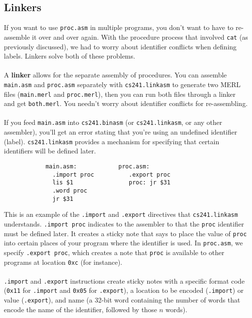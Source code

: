 \documentclass[]{article}
\theoremstyle{definition}
\begin{document}
		\subsection{Linkers}
			If you want to use \verb+proc.asm+ in multiple programs, you don't want to have to re-assemble it over and over again. With the procedure process that involved \verb+cat+ (as previously discussed), we had to worry about identifier conflicts when defining labels. Linkers solve both of these problems.
			\\ \\
			A \textbf{linker} allows for the separate assembly of procedures. You can assemble \verb+main.asm+ and \verb+proc.asm+ separately with \verb+cs241.linkasm+ to generate two MERL files (\verb+main.merl+ and \verb+proc.merl+), then you can run both files through a linker and get \verb+both.merl+. You needn't worry about identifier conflicts for re-assembling.
			\\ \\
			If you feed \verb+main.asm+ into \verb+cs241.binasm+ (or \verb+cs241.linkasm+, or any other assembler), you'll get an error stating that you're using an undefined identifier (label). \verb+cs241.linkasm+ provides a mechanism for specifying that certain identifiers will be defined later. 
			\begin{verbatim}
			main.asm:            proc.asm:
			  .import proc          .export proc
			  lis $1                proc: jr $31
			  .word proc
			  jr $31
			\end{verbatim}
			This is an example of the \verb+.import+ and \verb+.export+ directives that \verb+cs241.linkasm+ understands. \verb+.import proc+ indicates to the assembler to that the \verb+proc+ identifier must be defined later. It creates a sticky note that says to place the value of \verb+proc+ into certain places of your program where the identifier is used. In \verb+proc.asm+, we specify \verb+.export proc+, which creates a note that \verb+proc+ is available to other programs at location \verb+0xc+ (for instance).
			\\ \\
			\verb+.import+ and \verb+.export+ instructions create sticky notes with a specific format code (\verb+0x11+ for \verb+.import+ and \verb+0x05+ for \verb+.export+), a location to be encoded (\verb+.import+) or value (\verb+.export+), and name (a 32-bit word containing the number of words that encode the name of the identifier, followed by those $n$ words).
			\\ \\
\end{document}
